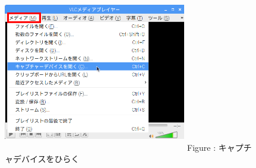 \documentclass[a4paper,12pt]{jarticle}
\begin{document}
\begin{figure}[ht]
  \centering
  \begin{minipage}{8.096cm}
    {\upshape
      \includegraphics[width=8.0cm,height=7.0cm]{textbook-img116.png}
      \newline
      Figure {\theFigure\label{seq:refFigure22}}:
      キャプチャデバイスをひらく}
  \end{minipage}
\end{figure}
\clearpage
\end{document}
